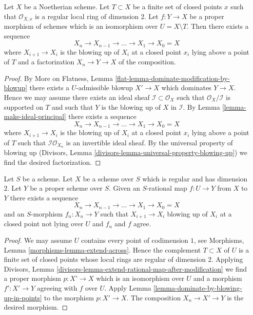 \begin{lemma}
\label{lemma-dominate-by-blowing-up-in-points}
Let $X$ be a Noetherian scheme. Let $T \subset X$ be a finite set of
closed points $x$ such that $\mathcal{O}_{X, x}$ is a regular local
ring of dimension $2$. Let $f : Y \to X$ be a proper morphism of
schemes which is an isomorphism over $U = X \setminus T$.
Then there exists a sequence
$$
X_n \to X_{n - 1} \to \ldots \to X_1 \to X_0 = X
$$
where $X_{i + 1} \to X_i$ is the blowing up of $X_i$ at a closed
point $x_i$ lying above a point of $T$ and a factorization $X_n \to Y \to X$
of the composition.
\end{lemma}

\begin{proof}
By More on Flatness, Lemma \ref{flat-lemma-dominate-modification-by-blowup} 
there exists a $U$-admissible blowup $X' \to X$ which dominates
$Y \to X$. Hence we may assume there exists an ideal sheaf
$\mathcal{I} \subset \mathcal{O}_X$ such that
$\mathcal{O}_X/\mathcal{I}$ is supported on $T$ and such that
$Y$ is the blowing up of $X$ in $\mathcal{I}$.
By Lemma \ref{lemma-make-ideal-principal} 
there exists a sequence
$$
X_n \to X_{n - 1} \to \ldots \to X_1 \to X_0 = X
$$
where $X_{i + 1} \to X_i$ is the blowing up of $X_i$ at a closed
point $x_i$ lying above a point of $T$ such that
$\mathcal{I}\mathcal{O}_{X_n}$ is an invertible ideal sheaf.
By the universal property of blowing up
(Divisors, Lemma
\ref{divisors-lemma-universal-property-blowing-up})
we find the desired factorization.
\end{proof}

\begin{lemma}
\label{lemma-extend-rational-map-blowing-up}
Let $S$ be a scheme. Let $X$ be a scheme over $S$ which is
regular and has dimension $2$. Let $Y$ be a proper
scheme over $S$. Given an $S$-rational map $f : U \to Y$ from
$X$ to $Y$ there exists a sequence
$$
X_n \to X_{n - 1} \to \ldots \to X_1 \to X_0 = X
$$
and an $S$-morphism $f_n : X_n \to Y$ such that $X_{i + 1} \to X_i$
blowing up of $X_i$ at a closed point not lying over $U$
and $f_n$ and $f$ agree.
\end{lemma}

\begin{proof}
We may assume $U$ contains every point of codimension $1$, see
Morphisms, Lemma \ref{morphisms-lemma-extend-across}.
Hence the complement $T \subset X$ of $U$ is a finite set
of closed points whose local rings are regular of dimension $2$.
Applying
Divisors, Lemma \ref{divisors-lemma-extend-rational-map-after-modification}
we find a proper morphism $p : X' \to X$ which is an isomorphism
over $U$ and a morphism $f' : X' \to Y$ agreeing with $f$ over $U$.
Apply Lemma \ref{lemma-dominate-by-blowing-up-in-points}
to the morphism $p : X' \to X$. The composition $X_n \to X' \to Y$ is
the desired morphism.
\end{proof}






